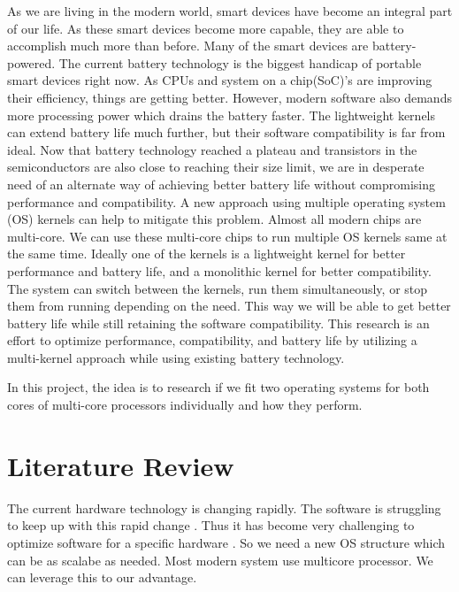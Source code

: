 \documentclass[11pt]{article}       %
\begin{document}
As we are living in the modern world, smart devices have become an integral part of our life. As these smart devices become more capable, they are able to accomplish much more than before. Many of the smart devices are battery-powered. The current battery technology is the biggest handicap of portable smart devices right now. As CPUs and system on a chip(SoC)’s are improving their efficiency, things are getting better. However, modern software also demands more processing power which drains the battery faster. The lightweight kernels can extend battery life much further, but their software compatibility is far from ideal. Now that battery technology reached a plateau and transistors in the semiconductors are also close to reaching their size limit, we are in desperate need of an alternate way of achieving better battery life without compromising performance and compatibility. A new approach using multiple operating system (OS) kernels can help to mitigate this problem. Almost all modern chips are multi-core. We can use these multi-core chips to run multiple OS kernels same at the same time. Ideally one of the kernels is a lightweight kernel for better performance and battery life, and a monolithic kernel for better compatibility. The system can switch between the kernels, run them simultaneously, or stop them from running depending on the need. This way we will be able to get better battery life while still retaining the software compatibility. This research is an effort to optimize performance, compatibility, and battery life by utilizing a multi-kernel approach while using existing battery technology. 

In this project, the idea is to research if we fit two operating systems for both cores of multi-core processors individually and how they perform.


\section{Literature Review} \label{litrev}
The current hardware technology is changing rapidly. The software is struggling to keep up with  this rapid change . Thus it has become very challenging to optimize software for a specific hardware\cite{DEL02} . So we need a new OS structure which can be as scalabe as needed. Most modern system use multicore processor. We can leverage this to our advantage.
\end{document}
